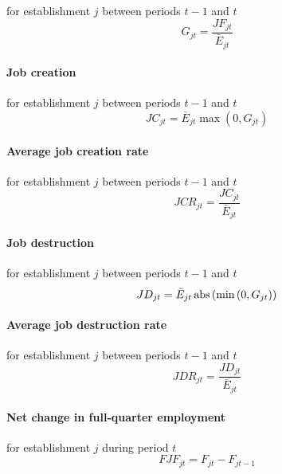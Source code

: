 for establishment $j$ between periods $t-1$ and $t$%
\begin{equation}
G_{jt}=\frac{JF_{jt}}{\bar{E}_{jt}}  \label{eq:Gjt}
\end{equation}

\paragraph{Job creation}

for establishment $j$ between periods $t-1$ and $t$%
\begin{equation}
JC_{jt}=\bar{E}_{jt}\max \left( {0,}G_{jt}\right)  \label{eq:JCjt}
\end{equation}

\paragraph{Average job creation rate}

for establishment $j$ between periods $t-1$ and $t$%
\begin{equation}
JCR_{jt}=\frac{JC_{jt}}{\bar{E}_{jt}}  \label{eq:JCRjt}
\end{equation}

\paragraph{Job destruction}

for establishment $j$ between periods $t-1$ and $t$%
\begin{equation}
JD_{jt}=\bar{E}_{jt}\mathop{\rm abs}\left( \min \left( 0,G_{jt}\right) \right)
\label{eq:JDjt}
\end{equation}

\paragraph{Average job destruction rate}

for establishment $j$ between periods $t-1$ and $t$%
\begin{equation}
JDR_{jt}=\frac{JD_{jt}}{\bar{E}_{jt}}  \label{eq:JDRjt}
\end{equation}

\paragraph{Net change in full-quarter employment}

for establishment $j$ during period $t$%
\begin{equation}
FJF_{jt}=F_{jt}-F_{jt-1}  \label{eq:FJFjt}
\end{equation}

